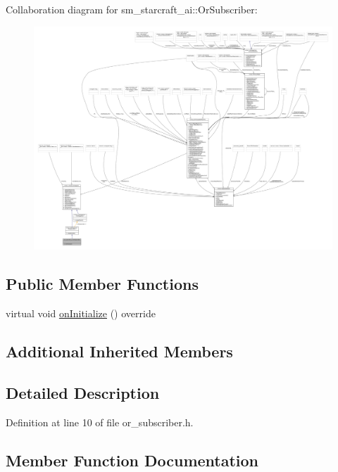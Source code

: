 Collaboration diagram for sm\+\_\+starcraft\+\_\+ai\+:\+:Or\+Subscriber\+:
\nopagebreak
\begin{figure}[H]
\begin{center}
\leavevmode
\includegraphics[width=350pt]{classsm__starcraft__ai_1_1OrSubscriber__coll__graph}
\end{center}
\end{figure}
\subsection*{Public Member Functions}
\begin{DoxyCompactItemize}
\item 
virtual void \hyperlink{classsm__starcraft__ai_1_1OrSubscriber_a6c50b70cd03e31c6c87a80eca9510c05}{on\+Initialize} () override
\end{DoxyCompactItemize}
\subsection*{Additional Inherited Members}


\subsection{Detailed Description}


Definition at line 10 of file or\+\_\+subscriber.\+h.



\subsection{Member Function Documentation}
\mbox{\label{classsm__starcraft__ai_1_1OrSubscriber_a6c50b70cd03e31c6c87a80eca9510c05}} 
